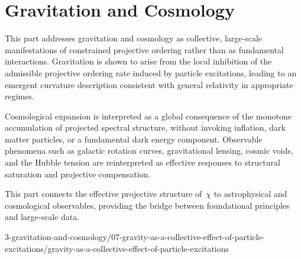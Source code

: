 \clearpage

\part{Gravitation and Cosmology}
  \label{part:gravitation-and-cosmology}

  This part addresses gravitation and cosmology as collective, large-scale
  manifestations of constrained projective ordering rather than as
  fundamental interactions.
  Gravitation is shown to arise from the local inhibition of the admissible
  projective ordering rate induced by particle excitations, leading to an
  emergent curvature description consistent with general relativity in
  appropriate regimes.

  Cosmological expansion is interpreted as a global consequence of the
  monotone accumulation of projected spectral structure, without invoking
  inflation, dark matter particles, or a fundamental dark energy component.
  Observable phenomena such as galactic rotation curves, gravitational
  lensing, cosmic voids, and the Hubble tension are reinterpreted as
  effective responses to structural saturation and projective compensation.

  This part connects the effective projective structure of~$\chi$ to
  astrophysical and cosmological observables, providing the bridge between
  foundational principles and large-scale data.

  \clearpage
  
  {3-gravitation-and-cosmology/07-gravity-as-a-collective-effect-of-particle-excitations/gravity-as-a-collective-effect-of-particle-excitations}
  
